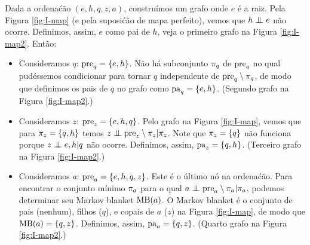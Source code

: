 \begin{exenumerate}
\begin{solution}
        Dada a ordena\'c\~ao $(e,h,q,z,a)$, constru\'imos um grafo onde $e$ \'e a raiz. Pela Figura \ref{fig:I-map} (e pela suposi\'c\~ao de mapa perfeito), vemos que $h \mathrel{\perp\mspace{-10mu}\perp} e$ n\~ao ocorre. Definimos, assim, $e$ como pai de $h$, veja o primeiro grafo na Figura \ref{fig:I-map2}. Ent\~ao:
        \begin{itemize}
            \item Consideramos $q$: $\mathrm{pre}_q = \{e,h\}$. N\~ao h\'a subconjunto $\pi_q$ de $\mathrm{pre}_q$ no qual pud\'essemos condicionar para tornar $q$ independente de $\mathrm{pre}_q \setminus \pi_q$, de modo que definimos os pais de $q$ no grafo como $\mathrm{pa}_q = \{e,h\}$. (Segundo grafo na Figura \ref{fig:I-map2}.)
            \item Consideramos $z$: $\mathrm{pre}_z = \{e,h,q\}$. Pelo grafo na Figura \ref{fig:I-map}, vemos que para $\pi_z = \{q,h\}$ temos $z \mathrel{\perp\mspace{-10mu}\perp} \mathrm{pre}_z \setminus \pi_z | \pi_z$. Note que $\pi_z = \{q\}$ n\~ao funciona porque $z \mathrel{\perp\mspace{-10mu}\perp} e,h | q$ n\~ao ocorre. Definimos, assim, $\mathrm{pa}_z =\{q,h\}$. (Terceiro grafo na Figura \ref{fig:I-map2}.)
            \item Consideramos $a$: $\mathrm{pre}_a = \{e,h,q,z\}$. Este \'e o \'ultimo n\'o na ordena\'c\~ao. Para encontrar o conjunto m\'inimo $\pi_a$ para o qual $a \mathrel{\perp\mspace{-10mu}\perp} \mathrm{pre}_a \setminus \pi_a | \pi_a$, podemos determinar seu Markov blanket $\textrm{MB}(a)$. O Markov blanket \'e o conjunto de pais (nenhum), filhos ($q$), e copais de $a$ ($z$) na Figura \ref{fig:I-map}, de modo que $\textrm{MB}(a) = \{q,z\}$. Definimos, assim, $\mathrm{pa}_a = \{q,z\}$. (Quarto grafo na Figura \ref{fig:I-map2}.)
        \end{itemize}
        \begin{figure}[h]
            \centering
            \hspace{1ex}
\end{figure}
\end{solution}
\end{exenumerate}
